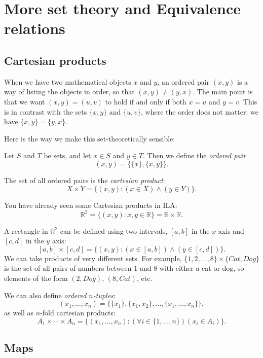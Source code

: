 \documentclass[11pt,dvipsnames]{book}
\def\R{\mathbb{R}}
\numberwithin{figure}{section} %
\numberwithin{table}{section} %
\begin{document}


\chapter{More set theory and Equivalence relations}

\section{Cartesian products}

When we have two mathematical objects $x$ and $y$, an ordered pair $(x,y)$ is a way of listing the objects in order, so that $(x,y) \neq (y,x)$.
The main point is that we want $(x,y) = (u,v)$ to hold if and only if both $x =u$ and $y = v$.
This is in contrast with the sets $\{x,y\}$ and $\{u,v\}$, where the order does not matter: we have $\{x,y\} = \{y,x\}$.

Here is the way we make this set-theoretically sensible:
\begin{definition}
Let $S$ and $T$ be sets, and let $x \in S$ and $y \in T$.
Then we define the \emph{ordered pair}
\[
(x,y) = \{\{x\},\{x,y\}\}.
\]

The set of all ordered pairs is the \emph{cartesian product}:
\[
X \times Y = \{(x,y) : (x \in X)\wedge (y \in Y)\}.
\]
\end{definition}

You have already seen some Cartesian products in ILA:
\[
\R^{2} = \{(x,y) : x,y\in\mathbb{R}\} = \mathbb{R}\times \mathbb{R}.
\]

A rectangle in $\mathbb{R}^{2}$ can be defined using two intervals, $[a,b]$ in the $x$-axis and $[c,d]$ in the $y$ axis:
\[
[a,b]\times [c,d]=\{(x,y) : (x\in [a,b]) \wedge (y\in [c,d])\}.
\]
We can take products of very different sets. For example, $\{1,2,...,8\}\times \{Cat,Dog\}$ is the set of all pairs of numbers between 1 and 8 with either a cat or dog, so elements of the form $(2,Dog)$, $(8,Cat)$, etc.

We can also define \emph{ordered $n$-tuples}:
\[
(x_1, \dots, x_n) = \{\{x_1\}, \{x_1,x_2\}, \dots, \{x_1, \dots, x_n\}\},
\]
as well as $n$-fold cartesian products:
\[
A_1 \times \cdots \times A_n =\{(x_1, \dots, x_n) : (\forall i \in \{1,\dots,n\})(x_i \in A_i)\}.
\]

\section{Maps}
\end{document}
